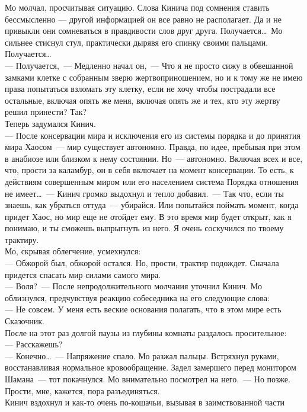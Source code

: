 Мо молчал, просчитывая ситуацию. Слова Кинича под сомнения ставить 
бессмысленно --- другой информацией он все равно не располагает. Да и не привыкли они 
сомневаться в правдивости слов друг друга. Получается\ldots\ Мо сильнее стиснул 
стул, практически дырявя его спинку своими пальцами. Получается\ldots\\
--- Получается,~--- Медленно начал он,~--- Что я не просто сижу в обвешанной 
замками клетке с собранным зверю жертвоприношением, но и к тому же не имею права 
попытаться взломать эту клетку, если не хочу чтобы пострадали все остальные, 
включая опять же меня, включая опять же и тех, кто эту жертву решил принести? 
Так?\\
Теперь задумался Кинич.\\
--- После консервации мира и исключения его из системы 
порядка и до принятия мира Хаосом~--- мир существует автономно. Правда, по 
идее, пребывая при этом в анабиозе или близком к нему состоянии. Но~--- автономно. 
Включая всех и все, что, прости за каламбур, он в себя включает на момент 
консервации. То есть, к действиям совершенным миром или его населением система 
Порядка отношения не имеет\ldots~--- Кинич громко выдохнул и тепло 
добавил.~--- Так что, если ты знаешь, как убраться оттуда~--- убирайся. Или попытайся поймать 
момент, когда придет Хаос, но мир еще не отойдет ему. В это время мир будет 
открыт, как я понимаю, и ты сможешь выпрыгнуть из него. Я очень соскучился по 
твоему трактиру.\\
Мо, скрывая облегчение, усмехнулся:\\
--- Обжорой был, обжорой остался. Но, прости, трактир подождет. Сначала придется 
спасать мир силами самого мира.\\
--- Воля?~--- После непродолжительного молчания уточнил Кинич. Мо облизнулся, 
предчувствуя реакцию собеседника на его следующие слова:\\
--- Не совсем. У меня есть веские основания полагать, что в этом мире есть 
Сказочник.\\
После на этот раз долгой паузы из глубины комнаты раздалось просительное:\\
--- Расскажешь?\\
--- Конечно\ldots~--- Напряжение спало. Мо разжал пальцы. Встряхнул руками, 
восстанавливая нормальное кровообращение. Задел замершего перед монитором 
Шамана~--- тот покачнулся. Мо внимательно посмотрел на него.~--- Но позже. Прости, мне, 
кажется, пора разъединяться.\\
Кинич вздохнул и как-то очень по-кошачьи, вызывая в заимствованной части 
